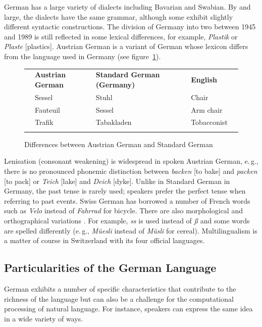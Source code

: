 \documentclass[]{../../metanetpaper}
\begin{document}
\begin{multicols}{2}
German has a large variety of dialects including Bavarian and Swabian. By and large, the dialects have the same grammar, although some exhibit slightly different syntactic constructions. The division of Germany into two between 1945 and 1989 is still reflected in some lexical differences, for example, \textit{Plastik} or \textit{Plaste} {[}plastics{]}. Austrian German is a variant of German whose lexicon differs from the language used in Germany (see figure~\ref{atgetabelle2_en}).

\begin{figure}[htb]
  \setlength{\tabcolsep}{2em}
  \begin{tabularx}{\textwidth}{lllll} \toprule\addlinespace
    & \textbf{Austrian German} & \textbf{Standard German (Germany)} & \textbf{English} & \\ \addlinespace\midrule\addlinespace
    & Sessel   & Stuhl      & Chair & \\ 
    & Fauteuil & Sessel     & Arm chair & \\ 
    & Trafik   & Tabakladen & Tobacconist & \\ \addlinespace\bottomrule
  \end{tabularx}
  \caption{Differences between Austrian German and Standard German}
  \label{atgetabelle2_en}
\end{figure}

Lenisation (consonant weakening) is widespread in spoken Austrian German, e.\,g., there is no pronounced phonemic distinction between \textit{backen} {[}to bake{]} and \textit{packen} {[}to pack{]} or \textit{Teich} {[}lake{]} and \textit{Deich} {[}dyke{]}. Unlike in Standard German in Germany, the past tense is rarely used; speakers prefer the perfect tense when referring to past events.
Swiss German has borrowed a number of French words such as \textit{Velo} instead of \textit{Fahrrad} for bicycle. There are also morphological and orthographical variations \cite{Cano1}. For example, \textit{ss} is used instead of \textit{ß} and some words are spelled differently (e.\,g., \textit{Müesli} instead of \textit{Müsli} for cereal). Multilingualism is a matter of course in Switzerland with its four official languages.

\subsection{Particularities of the German Language}

German exhibits a number of specific characteristics that contribute to the richness of the language but can also be a challenge for the computational processing of natural language. For instance, speakers can express the same idea in a wide variety of ways.


\end{multicols}
\end{document}
